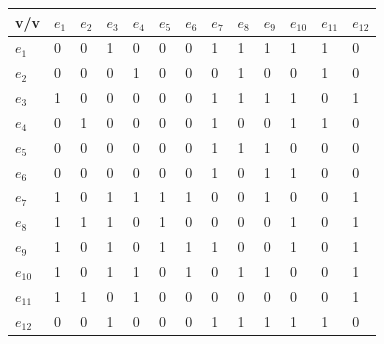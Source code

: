 \documentclass[a4paper,12pt]{article}
\begin{document}
\begin{table}[H]
    \centering
    \begin{tabular}{|l|l|l|l|l|l|l|l|l|l|l|l|l|}
    \hline
        v/v & $e_1$ & $e_2$ & $e_3$ & $e_4$ & $e_5$ & $e_6$ & $e_7$ & $e_8$ & $e_9$ & $e_{10}$ & $e_{11}$ & $e_{12}$ \\ \hline
        $e_1$ & 0 & 0 & 1 & 0 & 0 & 0 & 1 & 1 & 1 & 1 & 1 & 0 \\ \hline
        $e_2$ & 0 & 0 & 0 & 1 & 0 & 0 & 0 & 1 & 0 & 0 & 1 & 0 \\ \hline
        $e_3$ & 1 & 0 & 0 & 0 & 0 & 0 & 1 & 1 & 1 & 1 & 0 & 1 \\ \hline
        $e_4$ & 0 & 1 & 0 & 0 & 0 & 0 & 1 & 0 & 0 & 1 & 1 & 0 \\ \hline
        $e_5$ & 0 & 0 & 0 & 0 & 0 & 0 & 1 & 1 & 1 & 0 & 0 & 0 \\ \hline
        $e_6$ & 0 & 0 & 0 & 0 & 0 & 0 & 1 & 0 & 1 & 1 & 0 & 0 \\ \hline
        $e_7$ & 1 & 0 & 1 & 1 & 1 & 1 & 0 & 0 & 1 & 0 & 0 & 1 \\ \hline
        $e_8$ & 1 & 1 & 1 & 0 & 1 & 0 & 0 & 0 & 0 & 1 & 0 & 1 \\ \hline
        $e_9$ & 1 & 0 & 1 & 0 & 1 & 1 & 1 & 0 & 0 & 1 & 0 & 1 \\ \hline
        $e_{10}$ & 1 & 0 & 1 & 1 & 0 & 1 & 0 & 1 & 1 & 0 & 0 & 1 \\ \hline
        $e_{11}$ & 1 & 1 & 0 & 1 & 0 & 0 & 0 & 0 & 0 & 0 & 0 & 1 \\ \hline
        $e_{12}$ & 0 & 0 & 1 & 0 & 0 & 0 & 1 & 1 & 1 & 1 & 1 & 0 \\ \hline
    \end{tabular}
\end{table}
\end{document}

